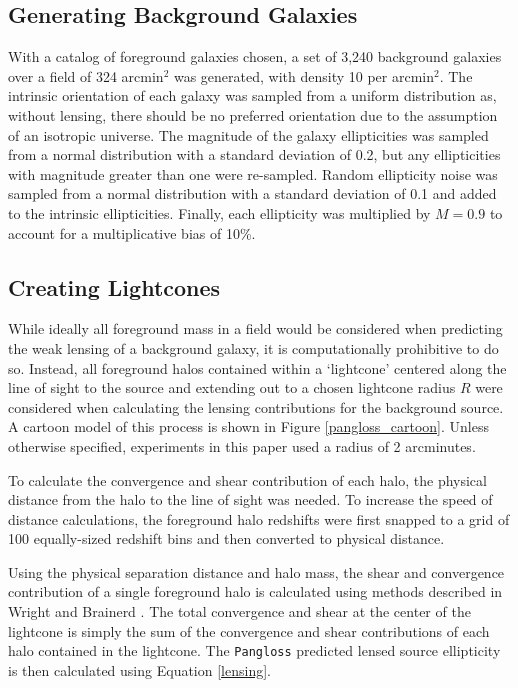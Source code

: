 \documentclass[%
 reprint,
 amsmath,amssymb,
 aps,nofootinbib
]{revtex4-1}
\begin{document}
\subsection*{Generating Background Galaxies}
With a catalog of foreground galaxies chosen, a set of 3,240 background galaxies over a field of 324 arcmin$^2$ was generated, with density 10 per arcmin$^2$. The intrinsic orientation of each galaxy was sampled from a uniform distribution as, without lensing, there should be no preferred orientation due to the assumption of an isotropic universe. The magnitude of the galaxy ellipticities was sampled from a normal distribution with a standard deviation of 0.2, but any ellipticities with magnitude greater than one were re-sampled. Random ellipticity noise was sampled from a normal distribution with a standard deviation of 0.1 and added to the intrinsic ellipticities. Finally, each ellipticity was multiplied by $M=0.9$ to account for a multiplicative bias of 10\%.

\subsection*{Creating Lightcones}

While ideally all foreground mass in a field would be considered when predicting the weak lensing of a background galaxy, it is computationally prohibitive to do so. Instead, all foreground halos contained within a `lightcone' centered along the line of sight to the source and extending out to a chosen lightcone radius $R$ were considered when calculating the lensing contributions for the background source. A cartoon model of this process is shown in Figure \ref{pangloss_cartoon}. Unless otherwise specified, experiments in this paper used a radius of 2 arcminutes.

To calculate the convergence and shear contribution of each halo, the physical distance from the halo to the line of sight was needed. To increase the speed of distance calculations, the foreground halo redshifts were first snapped to a grid of 100 equally-sized redshift bins and then converted to physical distance.

Using the physical separation distance and halo mass, the shear and convergence contribution of a single foreground halo is calculated using methods described in Wright and Brainerd \cite{lensing_calc}. The total convergence and shear at the center of the lightcone is simply the sum of the convergence and shear contributions of each halo contained in the lightcone. The \texttt{Pangloss} predicted lensed source ellipticity is then calculated using Equation \eqref{lensing}.
\end{document}
